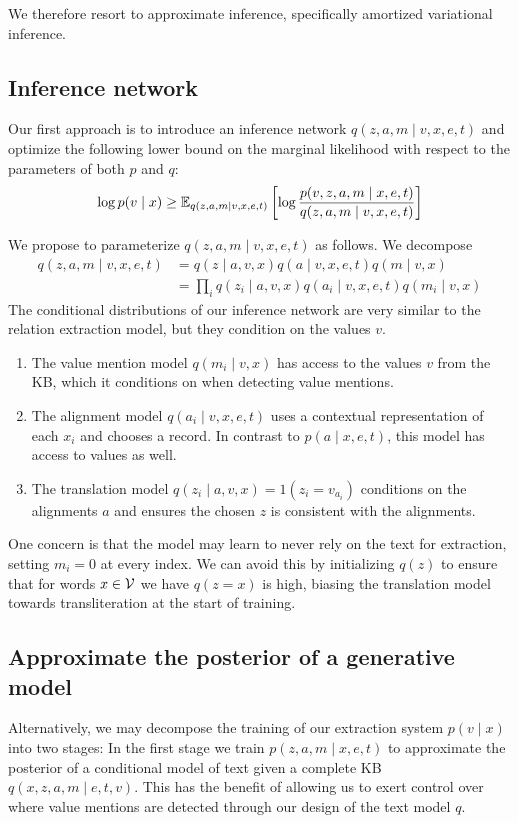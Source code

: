 \documentclass[12pt]{article}
\begin{document}
We therefore resort to approximate inference,
specifically amortized variational inference.

\subsection{Inference network}
Our first approach is to introduce an inference network $q(z,a,m\mid v,x,e,t)$
and optimize the following lower bound on the marginal likelihood
with respect to the parameters of both $p$ and $q$:
\begin{equation}
\label{eqn:lowerbound}
\log p(v\mid x) \geq
\mathbb{E}_{q(z,a,m\mid v,x,e,t)}\left[\log \frac{p(v,z,a,m\mid x,e,t)}{q(z,a,m\mid v,x,e,t)}\right]
\end{equation}

We propose to parameterize $q(z,a,m\mid v,x,e,t)$ as follows.
We decompose 
\begin{equation}
\begin{aligned}
q(z,a,m\mid v,x,e,t) &= q(z \mid a,v,x)q(a\mid v,x,e,t)q(m \mid v,x)\\
&= \prod_i q(z_i \mid a,v,x)q(a_i \mid v,x,e,t)q(m_i \mid v,x)
\end{aligned}
\end{equation}
The conditional distributions of our inference network
are very similar to the relation extraction model,
but they condition on the values $v$.
\begin{enumerate}
\item The value mention model $q(m_i \mid v,x)$ 
    has access to the values $v$ from the KB, which it conditions on
    when detecting value mentions. 
\item The alignment model $q(a_i \mid v,x,e,t)$
    uses a contextual representation of each $x_i$ and chooses a record.
    In contrast to $p(a\mid x,e,t)$, this model has access to values as well.
\item The translation model $q(z_i \mid a,v,x) = 1(z_i = v_{a_i})$
    conditions on the alignments $a$ and ensures the chosen $z$ is consistent
    with the alignments. 
\end{enumerate}

One concern is that the model may learn to never rely on the text for extraction,
setting $m_i = 0$ at every index.
We can avoid this by initializing $q(z)$ to ensure that for words $x \in \mathcal{V}$ 
we have $q(z = x)$ is high, biasing the translation model towards transliteration
at the start of training.

\subsection{Approximate the posterior of a generative model}
Alternatively, we may decompose the training of our extraction system $p(v\mid x)$ into two stages:
In the first stage we train $p(z,a,m\mid x,e,t)$ to approximate the posterior
of a conditional model of text given a complete KB $q(x,z,a,m \mid e,t,v)$.
This has the benefit of allowing us to exert control over where value mentions are detected
through our design of the text model $q$.
\end{document}

